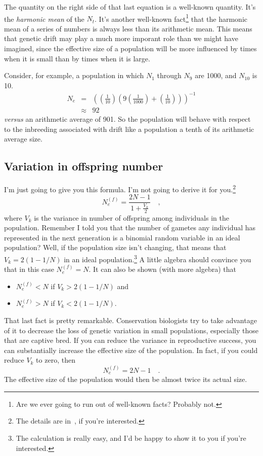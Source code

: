 The quantity on the right side of that last equation is a well-known
quantity. It's the {\it harmonic mean} of the $N_{t}$. It's another
well-known fact\footnote{Are we ever going to run out of well-known
  facts? Probably not.} that the harmonic mean of a series of numbers
is always less than its arithmetic mean. This means that genetic drift
may play a much more imporant role than we might have imagined, since
the effective size of a population will be more influenced by times
when it is small than by times when it is large.

Consider, for example, a population in which $N_1$ through $N_9$ are
1000, and $N_{10}$ is 10.
\begin{eqnarray*}
N_e &=& \left(\left(\frac{1}{10}\right)
            \left(9\left(\frac{1}{1000}\right) +
                   \left(\frac{1}{10}\right)\right)\right)^{-1} \\
    &\approx& 92
\end{eqnarray*}
{\it versus\/} an arithmetic average of 901. So the population will
behave with respect to the inbreeding associated with drift like a
population a tenth of its arithmetic average size.

\subsection*{Variation in offspring number}

I'm just going to give you this formula. I'm not going to derive it
for you.\footnote{The details are in~\cite{Crow-Kimura-1970}, if
  you're interested.}
\[
N_e^{(f)} = \frac{2N - 1}{1 + \frac{V_k}{2}} \quad ,
\]
where $V_k$ is the variance in number of offspring among individuals
in the population.  Remember I told you that the number of gametes any
individual has represented in the next generation is a binomial random
variable in an ideal population? Well, if the population size isn't
changing, that means that $V_k = 2(1 - 1/N)$ in an ideal
population.\footnote{The calculation is really easy, and I'd be happy
  to show it to you if you're interested.} A little algebra should
convince you that in this case $N_e^{(f)} = N$. It can also be shown
(with more algebra) that

\begin{itemize}

\item $N_e^{(f)} < N$ if $V_k > 2(1 - 1/N)$ and

\item $N_e^{(f)} > N$ if $V_k < 2(1 - 1/N)$.

\end{itemize}

\noindent That last fact is pretty remarkable. Conservation biologists
try to take advantage of it to decrease the loss of genetic variation
in small populations, especially those that are captive bred. If you
can reduce the variance in reproductive success, you can substantially
increase the effective size of the population. In fact, if you could
reduce $V_k$ to zero, then
\[
N_e^{(f)} = 2N - 1 \quad .
\]
The effective size of the population would then be almost twice its
actual size.

